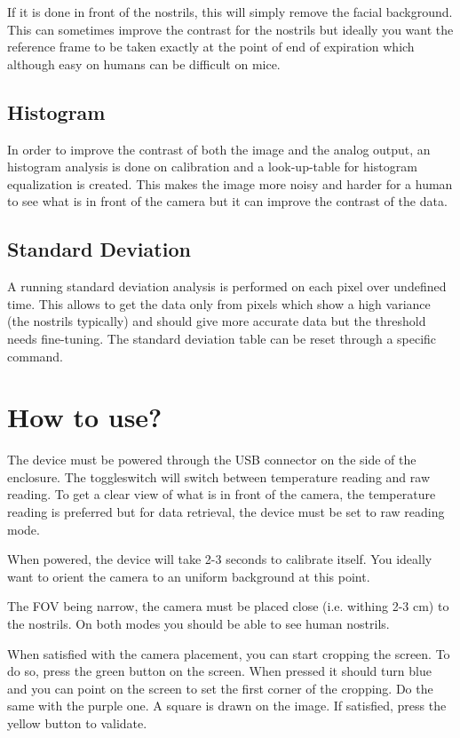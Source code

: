 \documentclass[a4paper]{article}
\begin{document}
If it is done in front of the nostrils, this will simply remove the facial background. This can sometimes improve the contrast for the nostrils but ideally you want the reference frame to be taken exactly at the point of end of expiration which although easy on humans can be difficult on mice.

\subsection{Histogram}
In order to improve the contrast of both the image and the analog output, an histogram analysis is done on calibration and a look-up-table for histogram equalization is created. This makes the image more noisy and harder for a human to see what is in front of the camera but it can improve the contrast of the data.

\subsection{Standard Deviation}
A running standard deviation analysis is performed on each pixel over undefined time. This allows to get the data only from pixels which show a high variance (the nostrils typically) and should give more accurate data but the threshold needs fine-tuning. The standard deviation table can be reset through a specific command.

\section{How to use?}
The device must be powered through the USB connector on the side of the enclosure.
The toggleswitch will switch between temperature reading and raw reading. To get a clear view of what is in front of the camera, the temperature reading is preferred but for data retrieval, the device must be set to raw reading mode.

When powered, the device will take 2-3 seconds to calibrate itself. You ideally want to orient the camera to an uniform background at this point. 

The FOV being narrow, the camera must be placed close (i.e. withing 2-3 cm) to the nostrils.
On both modes you should be able to see human nostrils.

When satisfied with the camera placement, you can start cropping the screen. To do so, press the green button on the screen. When pressed it should turn blue and you can point on the screen to set the first corner of the cropping. Do the same with the purple one. A square is drawn on the image. If satisfied, press the yellow button to validate.
\end{document}
